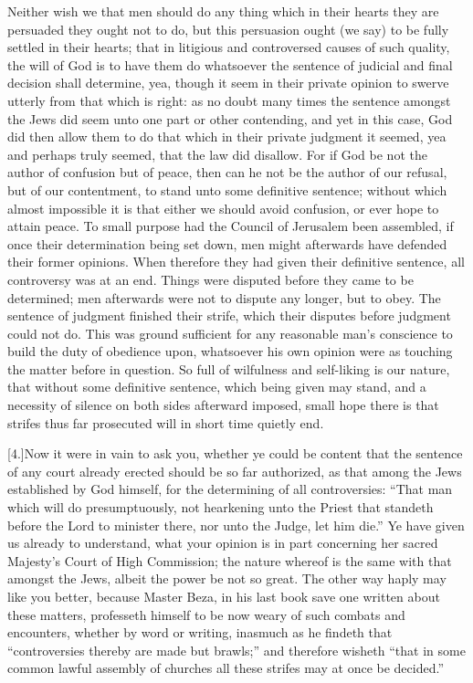 Neither wish we that men should do any thing which in their hearts they are persuaded they ought not to do, but this persuasion ought (we say) to be fully settled in their hearts; that in litigious and controversed causes of such quality, the will of God is to have them do whatsoever the sentence of judicial and final decision shall determine, yea, though it seem in their private opinion to swerve utterly from that which is right: as no doubt many times the sentence amongst the Jews did seem unto one part or other contending, and yet in this case, God did then allow them to do that which in their private judgment it seemed, yea and perhaps truly seemed, that the law did disallow. For if God be not the author of confusion but of peace, then can he not be the author of our refusal, but of our contentment, to stand unto some definitive sentence; without which almost impossible it is that either we should avoid confusion, or ever hope to attain peace. To small purpose had the Council of Jerusalem been assembled, if once their determination being set down, men might afterwards have defended their former opinions. When therefore they had given their definitive sentence, all controversy was at an end. Things were disputed before they came to be determined; men afterwards were not to dispute any longer, but to obey. The sentence of judgment finished their strife, which their disputes before judgment could not do. This was ground sufficient for any reasonable man’s conscience to build the duty of obedience upon, whatsoever his own opinion were as touching the matter before in question. So full of wilfulness and self-liking is our nature, that without some definitive sentence, which being given may stand, and a necessity of silence on both sides afterward imposed, small hope there is that strifes thus far prosecuted will in short time quietly end.

[4.]Now it were in vain to ask you, whether ye could be content that the sentence of any court already erected should be so far authorized, as that among the Jews established by God himself, for the determining of all controversies: “That man which will do presumptuously, not hearkening unto the Priest that standeth before the Lord to minister there, nor unto the Judge, let him die.” Ye have given us already to understand, what your opinion is in part concerning her sacred Majesty’s Court of High Commission; the nature whereof is the same with that amongst the Jews, albeit the power be not so great. The other way haply may like you better, because Master Beza, in his last book save one written about these matters, professeth himself to be now weary of such combats and encounters, whether by word or writing, inasmuch as he findeth that “controversies thereby are made but brawls;” and therefore wisheth “that in some common lawful assembly of churches all these strifes may at once be decided.”

